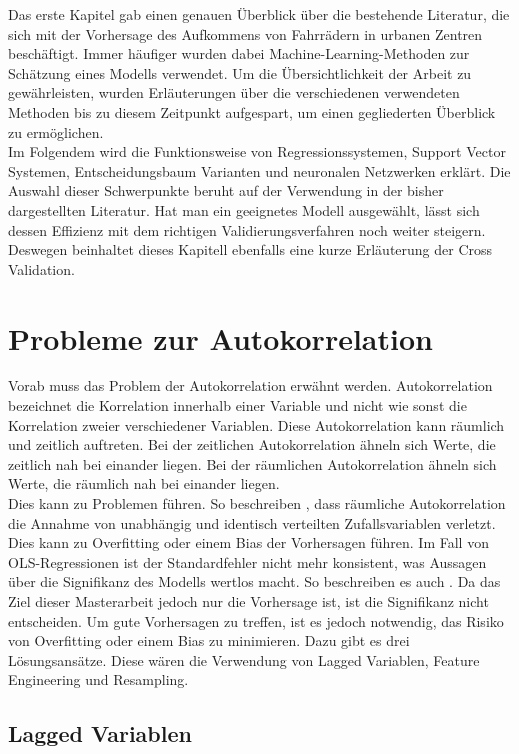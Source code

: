 \documentclass[a4paper,12pt]{thesis}
\begin{document}
Das erste Kapitel gab einen genauen Überblick über die bestehende Literatur, die sich mit der Vorhersage des Aufkommens von Fahrrädern in urbanen Zentren beschäftigt. Immer häufiger wurden dabei Machine-Learning-Methoden zur Schätzung eines Modells verwendet. Um die Übersichtlichkeit der Arbeit zu gewährleisten, wurden Erläuterungen über die verschiedenen verwendeten Methoden bis zu diesem Zeitpunkt aufgespart, um einen gegliederten Überblick zu ermöglichen.\\
Im Folgendem wird die Funktionsweise von Regressionssystemen, Support Vector Systemen, Entscheidungsbaum Varianten und neuronalen Netzwerken erklärt. Die Auswahl dieser Schwerpunkte beruht auf der Verwendung in der bisher dargestellten Literatur. Hat man ein geeignetes Modell ausgewählt, lässt sich dessen Effizienz mit dem richtigen Validierungsverfahren noch weiter steigern. Deswegen beinhaltet dieses Kapitell ebenfalls eine kurze Erläuterung der Cross Validation.

\section{Probleme zur Autokorrelation}

Vorab muss das Problem der Autokorrelation erwähnt werden. Autokorrelation bezeichnet die Korrelation innerhalb einer Variable und nicht wie sonst die Korrelation zweier verschiedener Variablen. Diese Autokorrelation kann räumlich und zeitlich auftreten. Bei der zeitlichen Autokorrelation ähneln sich Werte, die zeitlich nah bei einander liegen. Bei der räumlichen Autokorrelation ähneln sich Werte, die räumlich nah bei einander liegen.\\ 
Dies kann zu Problemen führen. So beschreiben \cite{LiuAutocorrelation2022}, dass räumliche Autokorrelation die Annahme von unabhängig und identisch verteilten Zufallsvariablen verletzt. Dies kann zu Overfitting oder einem Bias der Vorhersagen führen. Im Fall von OLS-Regressionen ist der Standardfehler nicht mehr konsistent, was Aussagen über die Signifikanz des Modells wertlos macht. So beschreiben es auch \cite{Stock2015b}. Da das Ziel dieser Masterarbeit jedoch nur die Vorhersage ist, ist die Signifikanz nicht entscheiden. Um gute Vorhersagen zu treffen, ist es jedoch notwendig, das Risiko von Overfitting oder einem Bias zu minimieren. Dazu gibt es drei Lösungsansätze. Diese wären die Verwendung von Lagged Variablen, Feature Engineering und Resampling.\\

\subsection{Lagged Variablen}
\end{document}
